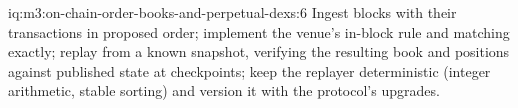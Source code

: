 \begin{solution}{iq:m3:on-chain-order-books-and-perpetual-dexs:6}
Ingest blocks with their transactions in proposed order; implement the venue's in-block rule and matching exactly; replay from a known snapshot,
verifying the resulting book and positions against published state at checkpoints; keep the replayer deterministic (integer arithmetic, stable
sorting) and version it with the protocol's upgrades.
\end{solution}
